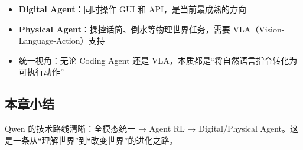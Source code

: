 \begin{itemize}
    \item \textbf{Digital Agent}：同时操作 GUI 和 API，是当前最成熟的方向
    \item \textbf{Physical Agent}：操控话筒、倒水等物理世界任务，需要 VLA（Vision-Language-Action）支持
    \item 统一视角：无论 Coding Agent 还是 VLA，本质都是``将自然语言指令转化为可执行动作''
\end{itemize}

\subsection{本章小结}

Qwen 的技术路线清晰：全模态统一 → Agent RL → Digital/Physical Agent。这是一条从``理解世界''到``改变世界''的进化之路。

